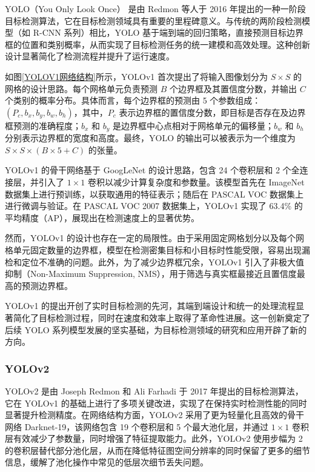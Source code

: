 \documentclass[11pt,twocolumn]{ctexart}
\begin{document}
YOLO（You Only Look Once）\cite{redmon2016you} 是由 Redmon 等人于 2016 年提出的一种一阶段目标检测算法，它在目标检测领域具有重要的里程碑意义。与传统的两阶段检测模型（如 R-CNN\cite{girshick2014rich,girshick2015fast,ren2016faster} 系列）相比，YOLO 基于端到端的回归策略，直接预测目标边界框的位置和类别概率，从而实现了目标检测任务的统一建模和高效处理。这种创新设计显著简化了检测流程并提升了运行速度。

如图\ref{YOLOV1网络结构}所示，YOLOv1 首次提出了将输入图像划分为 $S \times S$ 的网格的设计思路。每个网格单元负责预测 $B$ 个边界框及其置信度分数，并输出 $C$ 个类别的概率分布。具体而言，每个边界框的预测由 5 个参数组成：$(P_c, b_x, b_y, b_w, b_h)$，其中，$P_c$ 表示边界框的置信度分数，即目标是否存在及边界框预测的准确程度；$b_x$ 和 $b_y$ 是边界框中心点相对于网格单元的偏移量；$b_w$ 和 $b_h$ 分别表示边界框的宽度和高度。最终，YOLO 的输出可以被表示为一个维度为 $S \times S \times (B \times 5 + C)$ 的张量。

YOLOv1 的骨干网络基于 GoogLeNet\cite{szegedy2015going} 的设计思路，包含 24 个卷积层和 2 个全连接层，并引入了 $1 \times 1$ 卷积以减少计算复杂度和参数量。该模型首先在 ImageNet 数据集上进行预训练，以获取通用的特征表示；随后在 PASCAL VOC 数据集上进行微调与验证。在 PASCAL VOC 2007 数据集上，YOLOv1 实现了 63.4\% 的平均精度（AP），展现出在检测速度上的显著优势。

然而，YOLOv1 的设计也存在一定的局限性。由于采用固定网格划分以及每个网格单元固定数量的边界框，模型在检测密集目标和小目标时性能受限，容易出现漏检和定位不准确的问题。此外，为了减少边界框冗余，YOLOv1 引入了非极大值抑制\cite{neubeck2006efficient}（Non-Maximum Suppression, NMS），用于筛选与真实框最接近且置信度最高的预测边界框。

YOLOv1 的提出开创了实时目标检测的先河，其端到端设计和统一的处理流程显著简化了目标检测过程，同时在速度和效率上取得了革命性进展。这一创新奠定了后续 YOLO 系列模型发展的坚实基础，为目标检测领域的研究和应用开辟了新的方向。



\subsubsection{YOLOv2}
YOLOv2\cite{redmon2017yolo9000} 是由 Joseph Redmon 和 Ali Farhadi 于 2017 年提出的目标检测算法，它在 YOLOv1 的基础上进行了多项关键改进，实现了在保持实时检测性能的同时显著提升检测精度。在网络结构方面，YOLOv2 采用了更为轻量化且高效的骨干网络 Darknet-19，该网络包含 19 个卷积层和 5 个最大池化层，并通过 $1 \times 1$ 卷积层有效减少了参数量，同时增强了特征提取能力。此外，YOLOv2 使用步幅为 2 的卷积层替代部分池化层，从而在降低特征图空间分辨率的同时保留了更多的细节信息，缓解了池化操作中常见的低层次细节丢失问题。
\end{document}
